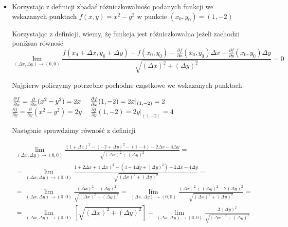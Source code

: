 \documentclass[12pt]{article}
\begin{document}
\begin{itemize}
        \item Korzystajc z definicji zbadać różniczkowalnośc podanych funkcji we wskazanych punktach \newline
        $f(x,y) = x^2 - y^2$
        w punkcie $(x_0, y_0) = (1, -2)$

        Korzystając z definicji, wiemy, żę funkcja jest różniczkowalna jeżeli zachodzi poniższa równość
        \begin{equation}
            \lim_{(\Delta x, \Delta y) \rightarrow (0,0)} \frac{f(x_0 + \Delta x, y_0 + \Delta y) - f(x_0, y_0) - \frac{\partial f}{\partial x} (x_0, y_0) \Delta x - \frac{\partial f}{\partial y} (x_0, y_0) \Delta y}{\sqrt{(\Delta x)^2 + (\Delta y)^2}} = 0
        \end{equation}

        Najpierw policzymy potrzebne pochodne cząstkowe we wskazanych punktach\newline

        $\frac{\partial f}{\partial x} = \frac{\partial }{\partial x} (x^2 - y^2) = 2x \; \; \; \; \; \frac{\partial f}{\partial x} (1,-2) = 2x | _{(1,-2)} = 2 \\$ \newline
        $\frac{\partial f}{\partial y} = \frac{\partial}{\partial y} (x^2 - y^2) = 2y \; \; \; \; \; \frac{\partial f}{\partial y} (1, -2) = 2y | _{(1,-2)} = 4$

        Następnie sprawdzimy równość z definicji

        \begin{equation}
            \begin{aligned}
                \lim_{(\Delta x, \Delta y) \rightarrow (0,0)} \frac{(1 + \Delta x)^2 - (-2 + \Delta y)^2 - (1 - 4) - 2 \Delta x - 4 \Delta y }{\sqrt{(\Delta x)^2 + (\Delta y)^2}} = \\
                = \lim_{(\Delta x, \Delta y) \rightarrow (0,0)} \frac{1 + 2 \Delta x + (\Delta x)^2 - (4 - 4 \Delta y + (\Delta y)^2) - 2 \Delta x - 4 \Delta y}{ \sqrt{(\Delta x)^2 + (\Delta y)^2}} = \\
                = \lim_{(\Delta x, \Delta y) \rightarrow (0,0)} \frac{(\Delta x)^2 - (\Delta y)^2}{\sqrt{(\Delta x)^2 + (\Delta y)^2}} = \lim_{(\Delta x, \Delta y) \rightarrow (0,0)} \frac{(\Delta x)^2 + (\Delta y)^2 - 2(\Delta y)^2}{\sqrt{(\Delta x)^2 + (\Delta y)^2}} = \\
                = \lim_{(\Delta x, \Delta y) \rightarrow (0,0)} \left[ \sqrt{(\Delta x)^2 + (\Delta y)^2} \right] - \lim_{(\Delta x, \Delta y) \rightarrow (0,0)} \frac{2(\Delta y)^2}{\sqrt{(\Delta x)^2 + (\Delta y)^2}} \\
            \end{aligned}
        \end{equation}


\end{itemize}
\end{document}
